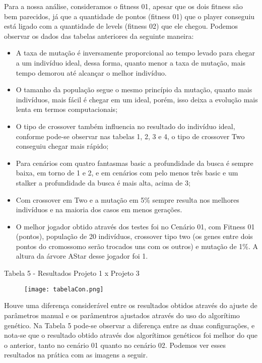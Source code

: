 \documentclass[12pt, a4paper, english, brazil]{abntex2}
\begin{document}
Para a nossa análise, consideramos o fitness 01, apesar que os dois fitness são bem parecidos, já que a quantidade de pontos (fitness 01) que o player conseguiu está ligado com a quantidade de levels (fitness 02) que ele chegou. Podemos observar os dados das tabelas anteriores da seguinte maneira:

\begin{itemize}
\item A taxa de mutação é inversamente proporcional ao tempo levado para chegar a um indivíduo ideal, dessa forma, quanto menor a taxa de mutação, mais tempo demorou até alcançar o melhor indivíduo.
\item O tamanho da população segue o mesmo princípio da mutação, quanto mais indivíduos, mais fácil é chegar em um ideal, porém, isso deixa a evolução mais lenta em termos computacionais;
\item O tipo de crossover também influencia no resultado do indivíduo ideal, conforme pode-se observar nas tabelas 1, 2, 3 e 4, o tipo de crossover Two conseguiu chegar mais rápido;
\item Para cenários com quatro fantasmas basic a profundidade da busca é sempre baixa, em torno de 1 e 2, e em cenários com pelo menos três basic e um stalker a profundidade da busca é mais alta, acima de 3;
\item Com crossover em Two e a mutação em 5\% sempre resulta nos melhores indivíduos e na maioria dos casos em menos gerações.
\item O melhor jogador obtido através dos testes foi no Cenário 01, com Fitness 01 (pontos), população de 20 indivíduos, crossover tipo two (os genes entre dois pontos do cromossomo serão trocados uns com os outros) e mutação de 1\%. A altura da árvore AStar desse jogador foi 1.
\end{itemize}

\begin{centering}Tabela 5 - Resultados Projeto 1 x Projeto 3
\begin{figure}[H]
\centering
\texttt{[image: tabelaCon.png]}
\end{figure}
\end{centering}

Houve uma diferença considerável entre os resultados obtidos através do ajuste de parâmetros manual e os parâmentros ajustados através do uso do algorítimo genético. Na Tabela 5 pode-se observar a diferença entre as duas configurações, e nota-se que o resultado obtido através dos algorítimos genéticos foi melhor do que o anterior, tanto no cenário 01 quanto no cenário 02. Podemos ver esses resultados na prática com as imagens a seguir.
\end{document}
